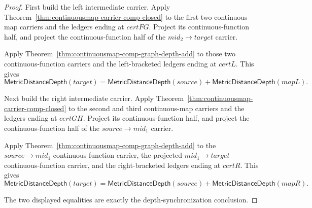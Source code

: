 \begin{proof}
First build the left intermediate carrier. Apply
Theorem~\ref{thm:continuousmap-carrier-comp-closed} to the first two
continuous-map carriers and the ledgers ending at $certFG$. Project its
continuous-function half, and project the continuous-function half of the
$mid_2 \to target$ carrier.

Apply Theorem~\ref{thm:continuousmap-comp-graph-depth-add} to those two
continuous-function carriers and the left-bracketed ledgers ending at $certL$.
This gives
$$
\mathsf{MetricDistanceDepth}(target)
=
\mathsf{MetricDistanceDepth}(source)+
\mathsf{MetricDistanceDepth}(mapL).
$$

Next build the right intermediate carrier. Apply
Theorem~\ref{thm:continuousmap-carrier-comp-closed} to the second and third
continuous-map carriers and the ledgers ending at $certGH$. Project its
continuous-function half, and project the continuous-function half of the
$source \to mid_1$ carrier.

Apply Theorem~\ref{thm:continuousmap-comp-graph-depth-add} to the
$source \to mid_1$ continuous-function carrier, the projected
$mid_1 \to target$ continuous-function carrier, and the right-bracketed ledgers
ending at $certR$. This gives
$$
\mathsf{MetricDistanceDepth}(target)
=
\mathsf{MetricDistanceDepth}(source)+
\mathsf{MetricDistanceDepth}(mapR).
$$

The two displayed equalities are exactly the depth-synchronization conclusion.
\end{proof}

